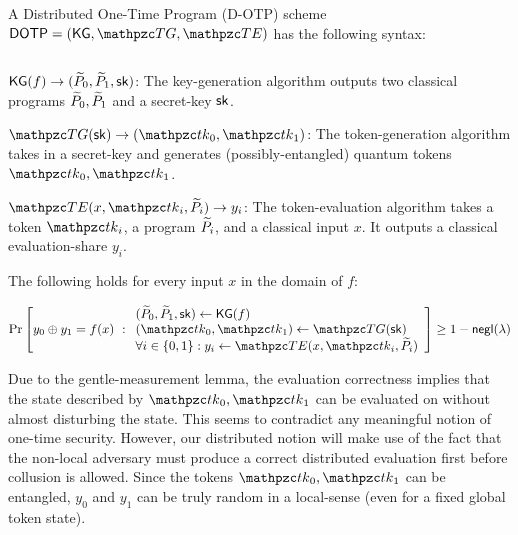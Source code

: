 A Distributed One-Time Program (D-OTP) scheme $\DOTP =
(\KG,\TG,\TE)$ has the following syntax:

\begin{description}

\item [Syntax:] $ $
\item $\mathsf{KG}(f) \rightarrow (\widetilde{P}_0, \widetilde{P}_1, \mathsf{sk})$: The key-generation algorithm
outputs two classical programs $\widetilde{P}_0, \widetilde{P}_1$ and a secret-key $\mathsf{sk}$.

\item $\TG(\sk) \ra (\qtk_0, \qtk_1)$: The token-generation algorithm takes
in a secret-key and generates (possibly-entangled) quantum tokens
$\qtk_0, \qtk_1$.

\item $\TE(x, \qtk_i, \tP_i) \rightarrow y_i$:
The token-evaluation algorithm takes a token $\qtk_i$, a
program $\widetilde{P}_i$, and a classical input $x$. It
outputs a classical evaluation-share $y_i$.

\item [Evaluation Correctness:] The following holds for every input
$x$ in the domain of $f$:

\begin{align}
\Pr\left[
y_0 \xor y_1 = f(x)
\ :
\begin{array}{ll}
(\tP_0, \tP_1, \sk) \leftarrow \KG(f)\\
(\qtk_0, \qtk_1) \gets \TG(\sk)\\
\forall i\in\bit: y_i \leftarrow \TE(x, \qtk_i, \tP_i)
\end{array}
\right] \geq 1 - \negl(\secp)
\end{align}
\end{description}

\begin{remark}
Due to the gentle-measurement lemma, the evaluation correctness
implies that the state described by $\qtk_0, \qtk_1$ can be evaluated
on without almost disturbing the state. This seems to contradict any
meaningful notion of one-time security. However, our distributed
notion will make use of the fact that the non-local adversary must
produce a correct distributed evaluation first before collusion is
allowed. Since the tokens $\qtk_0, \qtk_1$ can be entangled, $y_0$ and
$y_1$ can be truly random in a local-sense (even for a fixed global
token state).
\end{remark}


